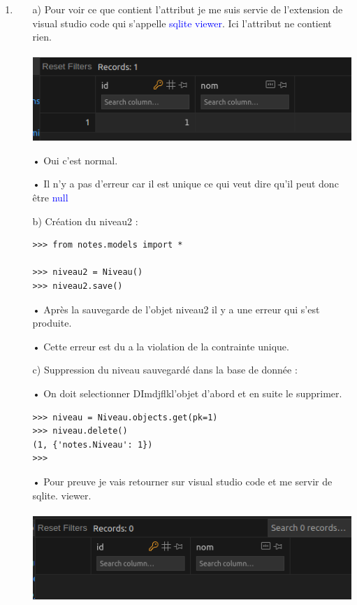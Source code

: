 \documentclass[10pt,a4paper]{article}
\begin{document}
\begin{enumerate}
\item 
\begin{itemize}
\item[]
\item[a)] Pour voir ce que contient l'attribut je me suis servie de l'extension de visual studio code qui s’appelle \textcolor{blue}{sqlite viewer}. Ici l'attribut ne contient rien.\\\\
\includegraphics[scale=0.6]{1.png}
\item[•] Oui c'est normal.
\item[•] Il n'y a pas d'erreur car il est unique ce qui veut dire qu'il peut donc être \textcolor{blue}{null}\\

\item[b)] Création du niveau2 : \\
\begin{verbatim}
>>> from notes.models import *

>>> niveau2 = Niveau()
>>> niveau2.save()

\end{verbatim}
\item[•] Après la sauvegarde de l'objet niveau2 il y a une erreur qui s'est produite.
\item[•] Cette erreur est du a la violation de la contrainte unique.\\

\item[c)] Suppression du niveau sauvegardé dans la base de donnée : \\
\item[•]On doit selectionner DImdjflkl'objet d'abord et en suite le supprimer.\\
\begin{verbatim}
>>> niveau = Niveau.objects.get(pk=1)
>>> niveau.delete()
(1, {'notes.Niveau': 1})
>>> 
\end{verbatim}
\item[•] Pour preuve je vais retourner sur visual studio code et me servir de sqlite. viewer.\\\\
\includegraphics[scale=0.6]{2.png}



\end{itemize}
\end{enumerate}
\end{document}
